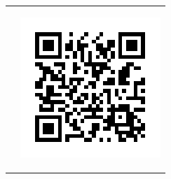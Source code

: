 \documentclass[portrait,a0b,final,a4resizeable]{include/a0poster}
\begin{document}
\begin{poster}
\begin{multicols}{2}
\begin{tabular}{cc}
\begin{minipage}[c]{0.8\columnwidth}
\end{minipage}
&
\begin{minipage}[c]{0.2\columnwidth}
\begin{centering}
\includegraphics[width=\linewidth]{figures/qrcode-paper-link}
\end{centering}
\end{minipage}
\end{tabular}
%
%
%
\end{multicols}



\end{poster}
\end{document}
